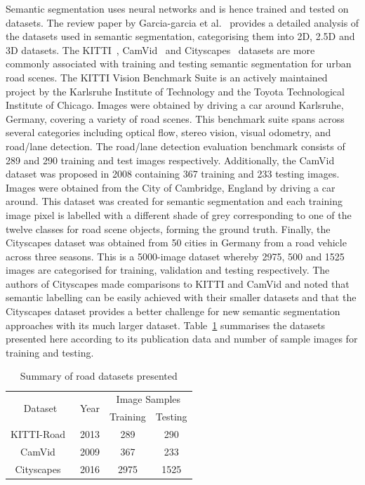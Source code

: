 Semantic segmentation uses neural networks and is hence trained and tested on datasets. The review paper by Garcia-garcia et al.~\cite{garcia-garcia_review_2017} provides a detailed analysis of the datasets used in semantic segmentation, categorising them into 2D, 2.5D and 3D datasets. The KITTI~\cite{geiger_are_2012}, CamVid~\cite{brostow_semantic_2009} and Cityscapes~\cite{cordts_cityscapes_2016} datasets are more commonly associated with training and testing semantic segmentation for urban road scenes. The KITTI Vision Benchmark Suite is an actively maintained project by the Karlsruhe Institute of Technology and the Toyota Technological Institute of Chicago. Images were obtained by driving a car around Karlsruhe, Germany, covering a variety of road scenes. This benchmark suite spans across several categories including optical flow, stereo vision, visual odometry, and road/lane detection. The road/lane detection evaluation benchmark consists of 289 and 290 training and test images respectively. Additionally, the CamVid dataset was proposed in 2008 containing 367 training and 233 testing images. Images were obtained from the City of Cambridge, England by driving a car around. This dataset was created for semantic segmentation and each training image pixel is labelled with a different shade of grey corresponding to one of the twelve classes for road scene objects, forming the ground truth. Finally, the Cityscapes dataset was obtained from 50 cities in Germany from a road vehicle across three seasons. This is a 5000-image dataset whereby 2975, 500 and 1525 images are categorised for training, validation and testing respectively. The authors of Cityscapes made comparisons to KITTI and CamVid and noted that semantic labelling can be easily achieved with their smaller datasets and that the Cityscapes dataset provides a better challenge for new semantic segmentation approaches with its much larger dataset. Table~\ref{tabdatasets} summarises the datasets presented here according to its publication data and number of sample images for training and testing.

\begin{table}[H]
	\renewcommand{\arraystretch}{1.3}
	\caption{Summary of road datasets presented}
	\label{tabdatasets}
	\centering
	\begin{tabular}{c c c c}
		\toprule
		        \multirow{2}{*}{Dataset}         & \multirow{2}{*}{Year} & \multicolumn{2}{c}{Image Samples} \\
		             \cmidrule{3-4}              &                       & Training & Testing                \\ \midrule
		   KITTI-Road~\cite{geiger_are_2012}     & 2013                  & 289      & 290                    \\
		  CamVid~\cite{brostow_semantic_2009}    & 2009                  & 367      & 233                    \\
		Cityscapes~\cite{cordts_cityscapes_2016} & 2016                  & 2975     & 1525                   \\ \bottomrule
	\end{tabular}
\end{table}

